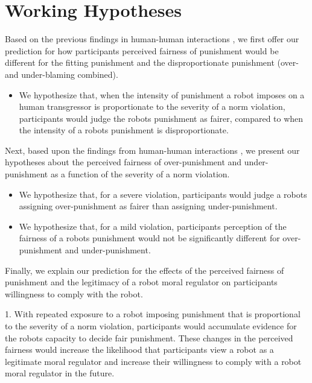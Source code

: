 \documentclass{article} %
\begin{document}
\section{Working Hypotheses}
Based on the previous findings in human-human interactions \cite{miller1981social,hogan1981retributive,ball1994just}, we first offer our prediction for how participants perceived fairness of punishment would be different for the fitting punishment and the disproportionate punishment (over- and under-blaming combined).
\begin{itemize}
\item We hypothesize that, when the intensity of punishment a robot imposes on a human transgressor is proportionate to the severity of a norm violation, participants would judge the robots punishment as fairer, compared to when the intensity of a robots punishment is disproportionate.
\end{itemize}

Next, based upon the findings from human-human interactions \cite{wagstaff1997overpunishment}, we present our hypotheses about the perceived fairness of over-punishment and under-punishment as a function of the severity of a norm violation.
\begin{itemize}
\item We hypothesize that, for a severe violation, participants would judge a robots assigning over-punishment as fairer than assigning under-punishment.
\item We hypothesize that, for a mild violation, participants perception of the fairness of a robots punishment would not be significantly different for over-punishment and under-punishment.
\end{itemize}

Finally, we explain our prediction for the effects of the perceived fairness of punishment and the legitimacy of a robot moral regulator on participants willingness to comply with the robot.
\begin{itemize}
1. With repeated exposure to a robot imposing punishment that is proportional to the severity of a norm violation, participants would accumulate evidence for the robots capacity to decide fair punishment. These changes in the perceived fairness would increase the likelihood that participants view a robot as a legitimate moral regulator and increase their willingness to comply with a robot moral regulator in the future.
\end{itemize}

\vspace{-0.79mm}
\vspace{-1.98mm}
\end{document}
